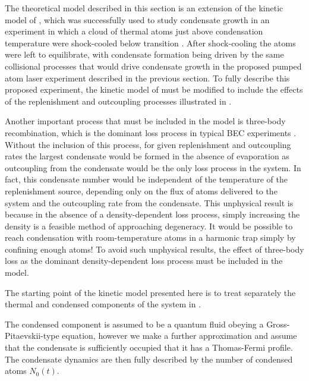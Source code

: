 The theoretical model described in this section is an extension of the kinetic model of \citet{Bijlsma:2000}, which was successfully used to study condensate growth in an experiment in which a cloud of thermal atoms just above condensation temperature were shock-cooled below transition \citep{Miesner:1998}.  After shock-cooling the atoms were left to equilibrate, with condensate formation being driven by the same collisional processes that would drive condensate growth in the proposed pumped atom laser experiment described in the previous section.  To fully describe this proposed experiment, the kinetic model of \citeauthor{Bijlsma:2000} must be modified to include the effects of the replenishment and outcoupling processes illustrated in . 

Another important process that must be included in the model is three-body recombination, which is the dominant loss process in typical BEC experiments \citep{Burt:1997fk,Soding:1999}. Without the inclusion of this process, for given replenishment and outcoupling rates the largest condensate would be formed in the absence of evaporation as outcoupling from the condensate would be the only loss process in the system. In fact, this condensate number would be independent of the temperature of the replenishment source, depending only on the flux of atoms delivered to the system and the outcoupling rate from the condensate. This unphysical result is because in the absence of a density-dependent loss process, simply increasing the density is a feasible method of approaching degeneracy. It would be possible to reach condensation with room-temperature atoms in a harmonic trap simply by confining enough atoms! To avoid such unphysical results, the effect of three-body loss as the dominant density-dependent loss process must be included in the model.

\parasep

The starting point of the kinetic model presented here is to treat separately the thermal and condensed components of the system in .

The condensed component is assumed to be a quantum fluid obeying a Gross-Pitaevskii-type equation, however we make a further approximation and assume that the condensate is sufficiently occupied that it has a Thomas-Fermi profile.  The condensate dynamics are then fully described by the number of condensed atoms $N_0(t)$.

